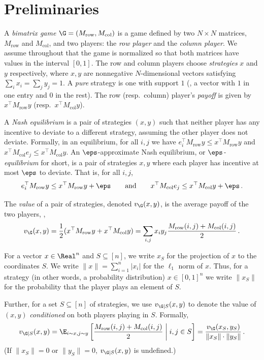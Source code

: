 \section{Preliminaries}

%
%
%
%

A \emph{bimatrix game} $\G = (M_{\mathrm{row}}, M_{\mathrm{col}})$ is
a game defined by two $N \times N$ matrices, $M_{\mathrm{row}}$
and $M_{\mathrm{col}}$, and two players: the \emph{row player} and the
\emph{column player}. We assume throughout that the game is normalized
so that both matrices have values in the interval $[0,1]$. The row and
column players choose \emph{strategies} $x$ and $y$ respectively,
where $x,y$ are nonnegative $N$-dimensional vectors satisfying
$\sum_ix_i=\sum_jy_j=1$.  A \emph{pure} strategy is one with support
$1$ (\ie, a vector with $1$ in one entry and $0$ in the rest). The
row (resp.\ column) player's \emph{payoff} is given by
$x^{\top}M_{\mathrm{row}}y$ (resp.\ $x^{\top}M_{\mathrm{col}}y$).

A \emph{Nash equilibrium} is a pair of strategies $(x,y)$ such that
neither player has any incentive to deviate to a different strategy,
assuming the other player does not deviate. Formally, in an
equilibrium, for all $i,j$ we have $e_i^{\top}M_{\mathrm{row}}y\leq
x^{\top}M_{\mathrm{row}}y$ and $x^{\top}M_{\mathrm{col}}e_j\leq
x^{\top}M_{\mathrm{col}}y$. An $\eps$-approximate Nash equilibrium, or
\emph{$\eps$-equilibrium} for short, is a pair of strategies $x,y$
where each player has incentive at most $\eps$ to deviate. That is,
for all $i,j$, 
\[
e_i^{\top}M_{\mathrm{row}}y\leq
x^{\top}M_{\mathrm{row}}y+\eps\qquad\text{and}\qquad
x^{\top}M_{\mathrm{col}}e_j\leq x^{\top}M_{\mathrm{col}}y+\eps\,.
\]

The \emph{value} of a pair of strategies, denoted $v_{\G}(x,y)$, is
the average payoff of the two players, \ie, 
\[
v_\G(x,y) = \frac{1}{2}(x^{\top}M_{\mathrm{row}}y +
x^{\top}M_{\mathrm{col}}y) = \sum_{i,j} x_i y_j
\frac{M_{\mathrm{row}}(i,j) + M_{\mathrm{col}}(i,j)}{2}\,.
\]

For a vector $x \in \Real^n$ and $S \subseteq [n]$, we write $x_S$ for
the projection of $x$ to the coordinates $S$.  We write $\|x\| =
\sum_{i = 1}^n |x_i|$ for the $\ell_1$ norm of $x$.  Thus, for a
strategy (in other words, a probability distribution) $x \in [0,1]^n$
we write $\|x_S\|$ for the probability that the player plays an
element of $S$.

Further, for a set $S \subseteq [n]$ of strategies, we use
$v_{\G|S}(x,y)$ to denote the value of $(x,y)$ \emph{conditioned} on
both players playing in $S$.  Formally,
\[
v_{\G|S}(x,y) = \E_{i \sim x, j \sim y}\left[
  \frac{M_{\mathrm{row}}(i,j)+M_{\mathrm{col}}(i,j)}{2}\;\middle|\;
  i,j \in S\right] = \frac{v_\G(x_S, y_S)}{\|x_S\| \cdot \|y_S\|}\,.
\]
(If $\|x_S\| = 0$ or $\|y_S\| = 0$, $v_{\G|S}(x,y)$ is undefined.)

